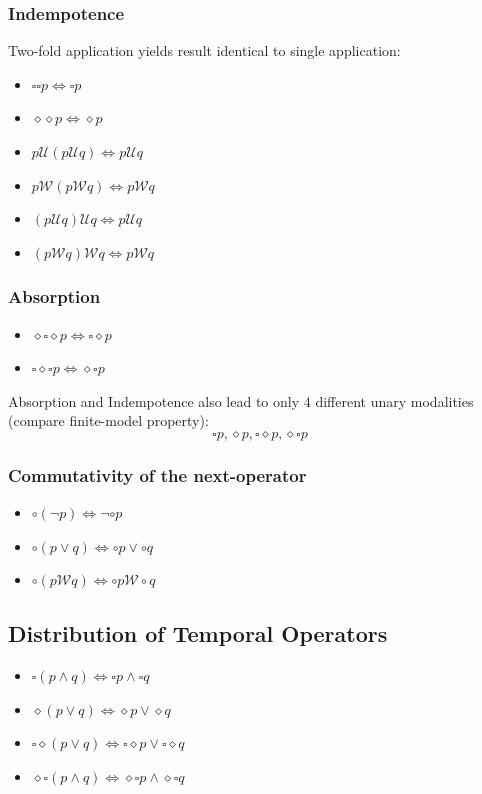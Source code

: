 \documentclass[a4paper, 10pt]{article}
\begin{document}
\begin{multicols}{2}
\subsubsection*{Indempotence}
Two-fold application yields result identical to single application:
\begin{itemize}
    \item $\square\square p \Leftrightarrow\square p$
    \item $\diamond\diamond p\Leftrightarrow\diamond p$
    \item $p \mathcal{U}(p \mathcal{U}q) \Leftrightarrow p \mathcal{U}q$
    \item $p \mathcal{W}(p \mathcal{W}q) \Leftrightarrow p \mathcal{W}q$
    \item $(p \mathcal{U}q)\mathcal{U}q \Leftrightarrow p \mathcal{U}q$
    \item $(p \mathcal{W}q)\mathcal{W}q \Leftrightarrow p \mathcal{W}q$
\end{itemize}
\subsubsection*{Absorption}
\begin{itemize}
    \item $\diamond\square\diamond p\Leftrightarrow \square\diamond p$
    \item $\square\diamond\square p\Leftrightarrow \diamond\square p$
\end{itemize}
Absorption and Indempotence also lead to only $4$ different unary modalities (compare finite-model property):
\[ \square p,\diamond p,\square\diamond p,\diamond\square p \]
\subsubsection*{Commutativity of the next-operator}%
\begin{itemize}
    \item $\circ(\neg p)\Leftrightarrow\neg\circ p$
    \item $\circ(p\vee q)\Leftrightarrow\circ p\vee\circ q$
    \item $\circ(p \mathcal{W}q)\Leftrightarrow\circ p \mathcal{W}\circ q$
\end{itemize}
\subsection*{Distribution of Temporal Operators}
\begin{itemize}
    \item $\square(p\wedge q)\Leftrightarrow\square p\wedge\square q$
    \item $\diamond(p\vee q)\Leftrightarrow\diamond p\vee \diamond q$
    \item $\square\diamond(p\vee q)\Leftrightarrow\square\diamond p\vee\square\diamond q$
    \item $\diamond\square(p\wedge q)\Leftrightarrow\diamond\square p\wedge\diamond\square q$
\end{itemize}
\end{multicols}
\end{document}

